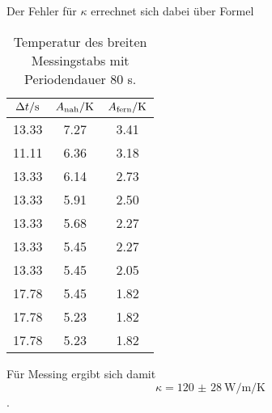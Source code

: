 Der Fehler für $\kappa$ errechnet sich dabei über Formel %

\begin{table}

	\centering

	\caption{Temperatur des breiten Messingstabs mit Periodendauer 80 s.}


	\begin{tabular}{S[table-format=3.2] S[table-format=3.2]S[table-format=3.2]}

		\toprule

		{$\Delta t/\si[per-mode=reciprocal]{\second}$}&{$A_\text{nah}/\si[per-mode=reciprocal]{\kelvin}$}&{$A_\text{fern}/\si[per-mode=reciprocal]{\kelvin}$} \\

		\midrule

		13.33 & 7.27 & 3.41 \\

		11.11 & 6.36 & 3.18 \\

		13.33 & 6.14 & 2.73 \\

		13.33 & 5.91 & 2.50 \\

		13.33 & 5.68 & 2.27 \\

		13.33 & 5.45 & 2.27 \\

		13.33 & 5.45 & 2.05 \\

		17.78 & 5.45 & 1.82 \\

		17.78 & 5.23 & 1.82 \\

		17.78 & 5.23 & 1.82 \\

		\bottomrule

	\end{tabular}

	\label{tab:tab2}

\end{table}

Für Messing ergibt sich damit \[\kappa = \SI{120(28)}{\watt\per\metre\per\kelvin}\].

